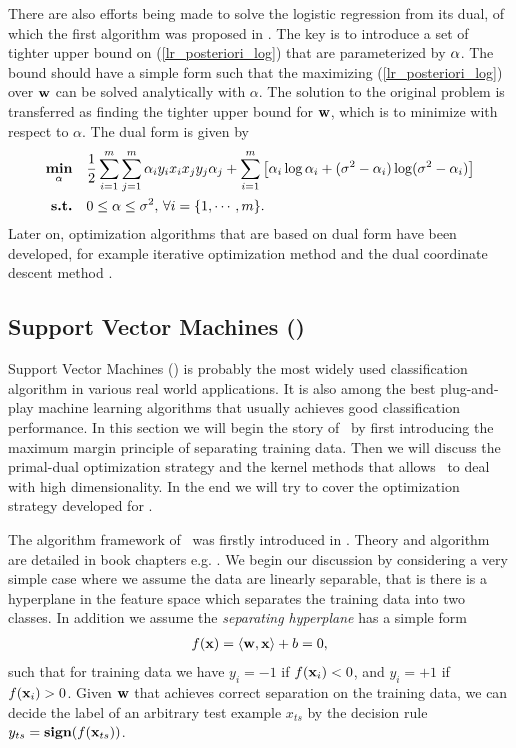 {%
There are also efforts being made to solve the logistic regression from its dual, of which the first algorithm was proposed in \citep{Jaakkola99probabilistic}.
The key is to introduce a set of tighter upper bound on (\ref{lr_posteriori_log}) that are parameterized by $\mathbf {\alpha}$.
The bound should have a simple form such that the maximizing (\ref{lr_posteriori_log}) over $\mathbf {w}$ can be solved analytically with $\alpha$.
The solution to the original problem is transferred as finding the tighter upper bound for  $\mathbf {w}$, which is to minimize with respect to $\alpha$.
The dual form is given by 
\begin{align*}
	\underset{\mathbf {\alpha}}{\textbf{min}} & \quad\frac{1}{2}\sum_{i=1}^{m}\sum_{j=1}^{m}\mathbf {\alpha}_iy_ix_ix_jy_j\mathbf {\alpha}_j + \sum_{i=1}^{m}\left[\mathbf {\alpha}_i\log\alpha_i+(\sigma^2-\mathbf {\alpha}_i)\log(\sigma^2-\mathbf {\alpha}_i)\right] \\
	\textbf{s.t.} &\quad 0\le\alpha\le\sigma^2, \, \forall i=\{1,\cdots,m\}.
\end{align*}
Later on, optimization algorithms that are based on dual form have been developed, for example iterative optimization method \citep{Keerthi05a} and the dual coordinate descent method \citep{Yu11dual}.



%
\subsection{Support Vector Machines (\svm)}
\label{sc_svm}

Support Vector Machines (\svm) is probably the most widely used classification algorithm in various real world applications.
It is also among the best plug-and-play machine learning algorithms that usually achieves good classification performance.
In this section we will begin the story of \svm\ by first introducing the maximum margin principle of separating training data.
Then we will discuss the primal-dual optimization strategy and the kernel methods that allows \svm\ to deal with high dimensionality.
In the end we will try to cover the optimization strategy developed for \svm.

The algorithm framework of \svm\ was firstly introduced in \citep{Boser92,Cortes95support}.
Theory and algorithm are detailed in book chapters e.g. \citep{Scholkopf02learning,taylor04,Bishop07}.
We begin our discussion by considering a very simple case where we assume the data are linearly separable, that is there is a hyperplane in the feature space which separates the training data into two classes.
In addition we assume the \textit{separating hyperplane} has a simple form
\begin{align*}
	f(\mathbf {x})=\langle \mathbf {w}, \mathbf {x} \rangle + b = 0,
\end{align*}
such that for training data we have $y_i=-1$ if $f(\mathbf {x}_i)<0$, and $y_i=+1$ if $f(\mathbf {x}_i)>0$.
Given $\mathbf {w}$ that achieves correct separation on the training data, we can decide the label of an arbitrary test example $x_{ts}$ by the decision rule $y_{ts}=\textbf{sign}(f(\mathbf {x}_{ts}))$.

}
